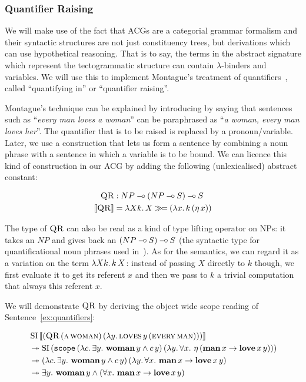\subsubsection{Quantifier Raising}

We will make use of the fact that ACGs are a categorial grammar formalism
and their syntactic structures are not just constituency trees, but
derivations which can use hypothetical reasoning. That is to say, the terms
in the abstract signature which represent the tectogrammatic structure can
contain $\lambda$-binders and variables. We will use this to implement
Montague's treatment of quantifiers~\cite{montague1973proper}, called
``quantifying in'' or ``quantifier raising''.

Montague's technique can be explained by introducing by saying that
sentences such as ``\emph{every man loves a woman}'' can be paraphrased as
``\emph{a woman, every man loves her}''. The quantifier that is to be
raised is replaced by a pronoun/variable. Later, we use a construction that
lets us form a sentence by combining a noun phrase with a sentence in which
a variable is to be bound. We can licence this kind of construction in our
ACG by adding the following (unlexicalised) abstract constant:

\begin{align*}
  \textsc{QR} &: NP \mathbin{{-}\mkern-3.5mu{\circ}} (NP \mathbin{{-}\mkern-3.5mu{\circ}} S) \mathbin{{-}\mkern-3.5mu{\circ}} S \\
  \llbracket \textsc{QR} \rrbracket &= \lambda X k.\, X \mathbin{\gg\!=} (\lambda x.\, k\,(\eta\,x))
\end{align*}

The type of $\textsc{QR}$ can also be read as a kind of type lifting operator
on NPs: it takes an $NP$ and gives back an $(NP \mathbin{{-}\mkern-3.5mu{\circ}} S) \mathbin{{-}\mkern-3.5mu{\circ}} S$ (the
syntactic type for quantificational noun phrases used
in~\cite{pogodalla2007generalizing}). As for the semantics, we can regard
it as a variation on the term $\lambda X k.\, k\,X$: instead of passing
$X$ directly to $k$ though, we first evaluate it to get its referent $x$
and then we pass to $k$ a trivial computation that always this referent
$x$.

We will demonstrate $\textsc{QR}$ by deriving the object wide scope reading of
Sentence~\ref{ex:quantifiers}:

\addtocounter{equation}{-2}
\NoChapterPrefix
\begin{align}
& \ap{\SI}{\sem{(\app{\abs{QR}}{(\ap{\abs{a}}{\abs{woman}})}{(\lam{y}{\app{\abs{loves}}{y}{(\ap{\abs{every}}{\abs{man}})}})})}} \nonumber \\
&\tto \ap{\SI}{(\app{\op{scope}}
  {(\lam{c}{\exists y.\ \ap{\obj{woman}}{y} \land \ap{c}{y}})}
  {(\lam{y}{\forall x.\ \etaE{(\ap{\obj{man}}{x} \rightarrow \app{\obj{love}}{x}{y})}})})} \nonumber \\
&\tto \ap{(\lam{c}{\exists y.\ \ap{\obj{woman}}{y} \land \ap{c}{y}})}
         {(\lam{y}{\forall x.\ \ap{\obj{man}}{x} \rightarrow \app{\obj{love}}{x}{y}})} \nonumber \\
&\tto \exists y.\ \ap{\obj{woman}}{y} \land (\forall x.\ \ap{\obj{man}}{x} \rightarrow \app{\obj{love}}{x}{y})
\end{align}
\ChapterPrefix
\addtocounter{equation}{1}

